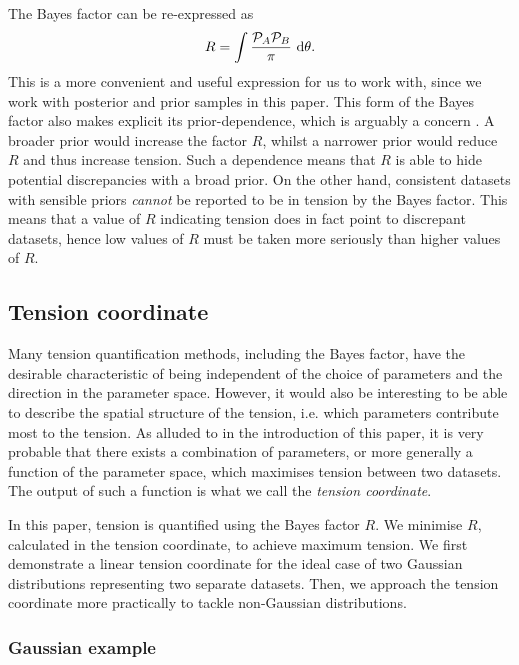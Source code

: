 \documentclass[%
 reprint,
 amsmath,amssymb,
 aps,
]{revtex4-2}
\begin{document}
The Bayes factor can be re-expressed as 
\begin{equation}
    R = \int \frac{\mathcal{P}_A \mathcal{P}_B}{\pi} \ \rm{d}\theta.
\end{equation}
This is a more convenient and useful expression for us to work with, since we work with posterior and prior samples in this paper. This form of the Bayes factor also makes explicit its prior-dependence, which is arguably a concern \cite{Handley2019}. A broader prior would increase the factor $R$, whilst a narrower prior would reduce $R$ and thus increase tension. Such a dependence means that $R$ is able to hide potential discrepancies with a broad prior. On the other hand, consistent datasets with sensible priors \textit{cannot} be reported to be in tension by the Bayes factor. This means that a value of $R$ indicating tension does in fact point to discrepant datasets, hence low values of $R$ must be taken more seriously than higher values of $R$.


\subsection{Tension coordinate}

Many tension quantification methods, including the Bayes factor, have the desirable characteristic of being independent of the choice of parameters and the direction in the parameter space. However, it would also be interesting to be able to describe the spatial structure of the tension, i.e. which parameters contribute most to the tension. As alluded to in the introduction of this paper, it is very probable that there exists a combination of parameters, or more generally a function of the parameter space, which maximises tension between two datasets. The output of such a function is what we call the \textit{tension coordinate}. 

In this paper, tension is quantified using the Bayes factor $R$. We minimise $R$, calculated in the tension coordinate, to achieve maximum tension. We first demonstrate a linear tension coordinate for the ideal case of two Gaussian distributions representing two separate datasets. Then, we approach the tension coordinate more practically to tackle non-Gaussian distributions.

\subsubsection{Gaussian example} \label{gaussian_tension}
\end{document}

